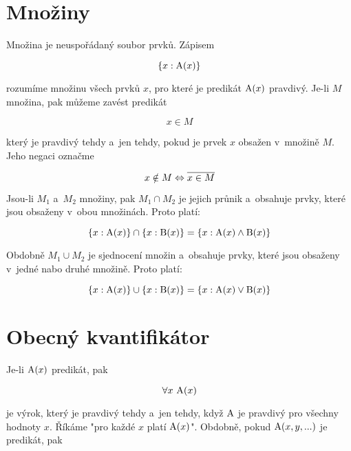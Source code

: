 \section{Množiny}

Množina je neuspořádaný soubor prvků. Zápisem

\begin{equation}
\{x: \mathrm{A}(x)\}
\end{equation}

rozumíme množinu všech prvků \(x\), pro které je predikát \(\mathrm{A}(x)\) pravdivý. Je-li \(M\) množina, pak můžeme zavést predikát

\begin{equation}
x \in M
\end{equation}

který je pravdivý tehdy a~jen tehdy, pokud je prvek \(x\) obsažen v~množině \(M\). Jeho negaci označme

\begin{equation}
x \notin M \Leftrightarrow \overline{x \in M}
\end{equation}

Jsou-li \(M_1\) a~\(M_2\) množiny, pak \(M_1 \cap M_2\) je jejich průnik a~obsahuje prvky, které jsou obsaženy v~obou množinách. Proto platí:

\begin{equation}
\{x: \mathrm{A}(x)\} \cap \{x: \mathrm{B}(x)\} = \{x: \mathrm{A}(x) \land \mathrm{B}(x)\}
\end{equation}

Obdobně \(M_1 \cup M_2\) je sjednocení množin a~obsahuje prvky, které jsou obsaženy v~jedné nabo druhé množině. Proto platí:

\begin{equation}
\{x: \mathrm{A}(x)\} \cup \{x: \mathrm{B}(x)\} = \{x: \mathrm{A}(x) \lor \mathrm{B}(x)\}
\end{equation}

\section{Obecný kvantifikátor}

Je-li \(\mathrm{A}(x)\) predikát, pak

\begin{equation}
\forall x \ \predicate{A}(x)
\end{equation}

je výrok, který je pravdivý tehdy a~jen tehdy, když \(\mathrm{A}\) je pravdivý pro všechny hodnoty \(x\). Říkáme "pro každé \(x\) platí \(\mathrm{A}(x)\)". Obdobně, pokud \(\mathrm{A}(x, y, ...)\) je predikát, pak

